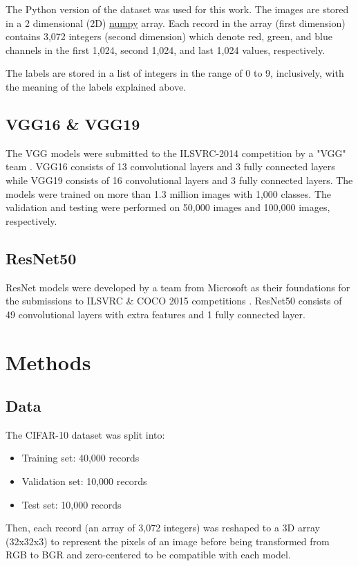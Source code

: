 \documentclass[10pt,twocolumn,letterpaper]{article}
\begin{document}
The Python version of the dataset was used for this work. The images are stored in a 2 dimensional (2D)
\href{https://numpy.org/}{numpy} array. Each record in the array (first dimension) contains 3,072 integers
(second dimension) which denote red, green, and blue channels in the first 1,024, second 1,024, and last 1,024
values, respectively.

The labels are stored in a list of integers in the range of 0 to 9, inclusively, with the meaning of the labels
explained above.

\subsection{VGG16 \& VGG19}

The VGG models were submitted to the ILSVRC-2014 competition by a "VGG" team \citep{vgg}. VGG16 consists of 13
convolutional layers and 3 fully connected layers while VGG19 consists of 16 convolutional layers and 3 fully
connected layers. The models were trained on more than 1.3 million images with 1,000 classes. The validation and
testing were performed on 50,000 images and 100,000 images, respectively.

\subsection{ResNet50}

ResNet models were developed by a team from Microsoft as their foundations for the submissions to ILSVRC \& COCO
2015 competitions \citep{resnet50}. ResNet50 consists of 49 convolutional layers with extra features and 1 fully
connected layer.

\section{Methods}

\subsection{Data}

The CIFAR-10 dataset was split into:
\begin{itemize}
  \item Training set: 40,000 records
  \item Validation set: 10,000 records
  \item Test set: 10,000 records
\end{itemize}
Then, each record (an array of 3,072 integers) was reshaped to a 3D array (32x32x3) to represent the pixels of
an image before being transformed from RGB to BGR and zero-centered to be compatible with each model.
\end{document}
